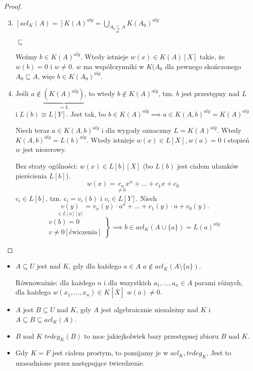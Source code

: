 \begin{proof}$ $

\begin{enumerate}
\setcounter{enumi}{2}
\item $[acl_K(A)=]K(A)^{alg}=\bigcup_{\underset{sk}{A_0\subseteq A}}K(A_0)^{alg}$

$\subseteq$

Weźmy $b\in K(A)^{alg}$. Wtedy istnieje $w(x)\in K(A)[X]$ takie, że $w(b)=0$ i $w\neq 0$. $w$ ma współczynniki w $K(A_0$ dla pewnego skończonego $A_0\subseteq A$, więc $b\in K(A_0)^{alg}$.

\item Jeśli $a\notin \underbrace{(K(A)^{alg})}_{=L}$, to wtedy $b\notin K(A)^{alg}$, tzn. $b$ jest przestępny nad $L$ i $L(b)\cong L[Y]$. Jest tak, bo $b\in K(A)^{alg}\implies a\in K(A, b)^{alg}=K(A)^{alg}$

Niech teraz $a\in K(A, b)^{alg}$ i dla wygody oznaczmy $L=K(A)^{alg}$. Wtedy $K(A,b)^{alg}=L(b)^{alg}$. Wtedy istnieje $w(x)\in L[X],w(a)=0$ i stopień $w$ jest niezerowy.

Bez straty ogólności: $w(x)\in L[b][X]$ (bo $L(b)$ jest ciałem ułamków pierścienia $L[b]$).
$$w(x)=\underset{\neq0}{c_n}x^n+...+c_1x+c_0$$
$c_i\in L[b]$, tzn. $c_i=v_i(b)$ i $v_i\in L[Y]$. Niech 
$$\underset{\in L[a][y]}{v(y)}=v_n(y)\cdot a^n+...+v_1(y)\cdot a+v_0(y).$$
$$\left.\begin{array}{l}v(b)=0\\v\neq 0 [\text{ćwiczenia}]\end{array}\right\}\implies b\in acl_K(A\cup\{a\})=L(a)^{alg}$$
\end{enumerate}
\end{proof}

\begin{bbox}
\begin{itemize}
    \item[\PHtunny] $A\subseteq U$ jest  nad $K$, gdy dla każdego $a\in A$ $a\notin acl_K(A\setminus\{a\})$.

    Równoważnie: dla każdego $n$ i dla wszystkich $a_1,...,a_n\in A$ parami różnych, dla każdego $w(x_1,...,x_n)\in K[\overline{X}]$ $w(\overline{a})\neq 0$.
    \item[\PHtunny] $A$ jest  $B\subseteq U$ nad $K$, gdy $A$ jest algebraicznie niezależny nad $K$ i $A\subseteq B\subseteq acl_K(A)$.
    \item[\PHtunny]  $B$ nad $K$ $trdeg_K(B)$ to moc jakiejkolwiek bazy przestępnej zbioru $B$ nad $K$.
    \item[\PHtunny] Gdy $K=F$ jest ciałem prostym, to pomijamy je w $acl_K,trdeg_K$. Jest to uzasadnione przez następujące twierdzenie.
\end{itemize}
\end{bbox}

